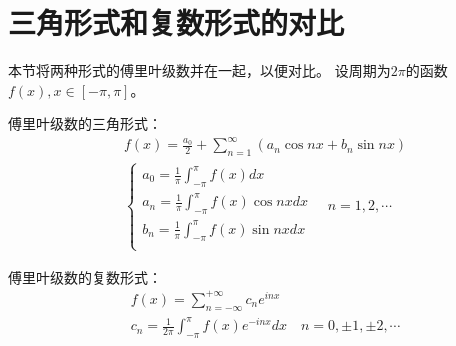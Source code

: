\section{三角形式和复数形式的对比}

本节将两种形式的傅里叶级数并在一起，以便对比。
设周期为$2\pi $的函数$f\left( x \right) ,x\in \left[ -\pi ,\pi \right] $。

傅里叶级数的三角形式：
\begin{align*}
&f\left( x \right) =\frac{a_0}{2}+\sum_{n=1}^{\infty}{\left( a_n\cos nx+b_n\sin nx \right)} \\
&\begin{cases}
	a_0=\frac{1}{\pi}\int_{-\pi}^{\pi}{f\left( x \right) dx}\\
	a_n=\frac{1}{\pi}\int_{-\pi}^{\pi}{f\left( x \right) \cos nxdx}\\
	b_n=\frac{1}{\pi}\int_{-\pi}^{\pi}{f\left( x \right) \sin nxdx}\\
\end{cases} \quad n=1,2,\cdots
\end{align*}

傅里叶级数的复数形式：
\begin{align*}
&f\left( x \right) =\sum_{n=-\infty}^{+\infty}{c_ne^{inx}} \\
&c_n=\frac{1}{2\pi}\int_{-\pi}^{\pi}{f\left( x \right) e^{-inx}dx} \quad n=0,\pm 1,\pm 2,\cdots
\end{align*}




